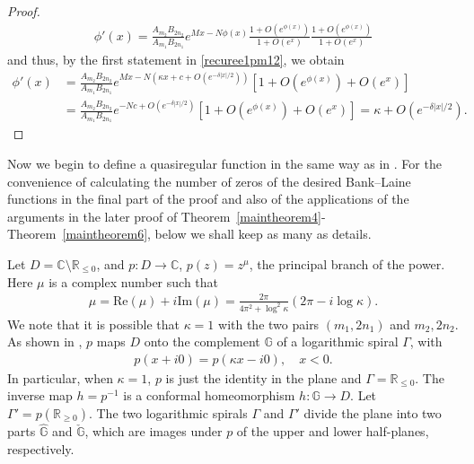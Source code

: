 \documentclass[12pt]{amsart}
\numberwithin{equation}{section}
\begin{document}
\begin{proof}
\begin{equation*}
\begin{split}
\phi'(x)=\frac{A_{m_2}B_{2n_2}}{A_{m_1}B_{2n_1}}e^{Mx-N\phi(x)}\frac{1+O(e^{\phi(x)})}{1+O(e^{x})}\frac{1+O(e^{\phi(x)})}{1+O(e^{x})}
\end{split}
\end{equation*}
and thus, by the first statement in \eqref{recuree1pm12}, we obtain
\begin{equation*}%
\begin{split}
\phi'(x)&=\frac{A_{m_2}B_{2n_2}}{A_{m_1}B_{2n_1}}e^{Mx-N(\kappa x+c+O(e^{-\delta|x|/2}))}\left[1+O(e^{\phi(x)})+O(e^{x})\right]\\
&=\frac{A_{m_2}B_{2n_2}}{A_{m_1}B_{2n_1}}e^{-Nc+O(e^{-\delta|x|/2})}\left[1+O(e^{\phi(x)})+O(e^{x})\right]=\kappa+O(e^{-\delta|x|/2}).
\end{split}
\end{equation*}

\end{proof}

Now we begin to define a quasiregular function in the same way as in \cite{Bergweilereremenko2019}. For the convenience of calculating the number of zeros of the desired Bank--Laine functions in the final part of the proof and also of the applications of the arguments in the later proof of Theorem~\ref{maintheorem4}-Theorem~\ref{maintheorem6}, below we shall keep as many as details.

Let $D=\mathbb{C}\setminus\mathbb{R}_{\leq 0}$, and $p:D\to \mathbb{C}$, $p(z)=z^{\mu}$, the principal branch of the power. Here $\mu$ is a complex number such that
\begin{equation}\label{recuree1pm23}
\begin{split}
\mu=\text{Re} (\mu)+i\text{Im}(\mu)=\frac{2\pi}{4\pi^2+\log^2\kappa}(2\pi-i\log \kappa).
\end{split}
\end{equation}
We note that it is possible that $\kappa=1$ with the two pairs $(m_1,2n_1)$ and $m_2,2n_2$. As shown in \cite{Bergweilereremenko2019}, $p$ maps $D$ onto the complement $\mathbb{G}$ of a logarithmic spiral $\Gamma$, with
\begin{equation}\label{recuree1pm24  bef1}
\begin{split}
p(x+i0)=p(\kappa x-i0), \quad  x<0.
\end{split}
\end{equation}
In particular, when $\kappa=1$, $p$ is just the identity in the plane and $\Gamma=\mathbb{R}_{\leq 0}$. The inverse map $h=p^{-1}$ is a conformal homeomorphism $h:\mathbb{G}\to D$. Let $\Gamma'=p(\mathbb{R}_{\geq 0})$. The two logarithmic spirals $\Gamma$ and $\Gamma'$ divide the plane into two parts $\hat{\mathbb{G}}$ and $\check{\mathbb{G}}$, which are images under $p$ of the upper and lower half-planes, respectively.
\end{document}
